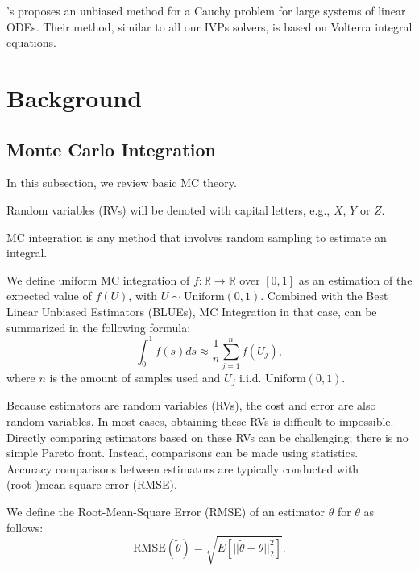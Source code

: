 \documentclass[a4paper,12pt]{article}
\begin{document}
\citeauthor{ermakov_monte_2021}'s \citeyear{ermakov_monte_2021} \cite{ermakov_monte_2021} proposes
an unbiased method for a Cauchy problem for large systems of linear ODEs. Their method, similar
to all our IVPs solvers, is based on Volterra integral equations.

\section{Background}

\subsection{Monte Carlo Integration}

In this subsection, we review basic MC theory. \\

\begin{notation}
  Random variables (RVs) will be denoted with capital letters, e.g., $X$, $Y$ or $Z$.
\end{notation}


MC integration is any method that involves random sampling to
estimate an integral.
\begin{definition}
  We define uniform MC integration of
  $f:\mathbb{R} \rightarrow \mathbb{R}$
  over $[0,1]$ as
  an estimation of the expected value of $f(U)$, with
  $U \sim \text{Uniform}(0,1)$. Combined
  with the Best Linear Unbiased Estimators (BLUEs), MC Integration
  in that case, can be summarized in the following formula:
  \begin{equation}\label{eq:BLUE}
    \int_{0}^1 f(s)ds \approx \frac{1}{n} \sum_{j=1}^{n}f(U_{j}),
  \end{equation}
  where $n$ is the amount of samples used and $U_{j}$ i.i.d. $\text{Uniform}(0,1)$.
\end{definition}

Because estimators are random variables (RVs), the cost and error are also random
variables. In most cases, obtaining these RVs is difficult to impossible.
Directly comparing estimators based on these RVs can be challenging;
there is no simple Pareto front. Instead, comparisons can be made
using statistics. \\

Accuracy comparisons between estimators
are typically conducted with (root-)mean-square error (RMSE).
\begin{definition}
  We define the Root-Mean-Square Error (RMSE) of an estimator $\tilde{\theta}$ for $\theta$  as follows:
  \begin{equation}
    \text{RMSE}(\tilde{\theta}) = \sqrt{E[||\tilde{\theta}-\theta||^{2}_{2}]}.
  \end{equation}
\end{definition}
\end{document}
